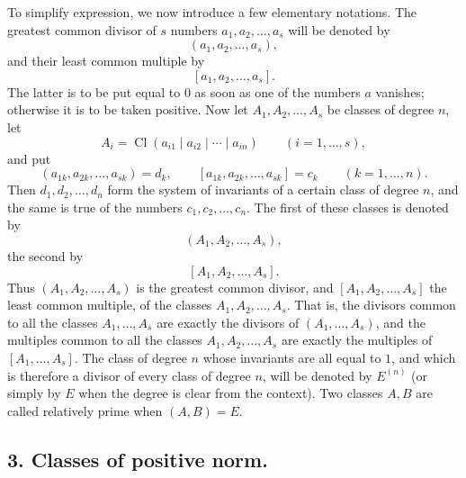 \documentclass[11pt,a4paper]{article}
\newcommand{\Cl}{\operatorname{Cl}}
\begin{document}
To simplify expression, we now introduce a few elementary notations. The greatest common divisor of $s$ numbers $a_1,a_2,\ldots,a_s$ will be denoted by
\[
 (a_1,a_2,\ldots,a_s),
\]
and their least common multiple by
\[
 [a_1,a_2,\ldots,a_s].
\]
The latter is to be put equal to $0$ as soon as one of the numbers $a$ vanishes; otherwise it is to be taken positive. Now let $A_1,A_2,\ldots,A_s$ be classes of degree $n$, let
\[
 A_i=\Cl(a_{i1}\mid a_{i2}\mid\cdots\mid a_{in})\qquad (i=1,\ldots,s),
\]
and put
\[
 (a_{1k},a_{2k},\ldots,a_{sk})=d_k,
 \qquad [a_{1k},a_{2k},\ldots,a_{sk}]=c_k\qquad(k=1,\ldots,n).
\]
Then $d_1,d_2,\ldots,d_n$ form the system of invariants of a certain class of degree $n$, and the same is true of the numbers $c_1,c_2,\ldots,c_n$. The first of these classes is denoted by
\[
 (A_1,A_2,\ldots,A_s),
\]
the second by
\[
 [A_1,A_2,\ldots,A_s].
\]
Thus $(A_1,A_2,\ldots,A_s)$ is the greatest common divisor, and $[A_1,A_2,\ldots,A_s]$ the least common multiple, of the classes $A_1,A_2,\ldots,A_s$. That is, the divisors common to all the classes $A_1,\ldots,A_s$ are exactly the divisors of $(A_1,\ldots,A_s)$, and the multiples common to all the classes $A_1,A_2,\ldots,A_s$ are exactly the multiples of $[A_1,\ldots,A_s]$. The class of degree $n$ whose invariants are all equal to $1$, and which is therefore a divisor of every class of degree $n$, will be denoted by $E^{(n)}$ (or simply by $E$ when the degree is clear from the context). Two classes $A,B$ are called relatively prime when $(A,B)=E$.

\subsection*{3. Classes of positive norm.}
\end{document}
